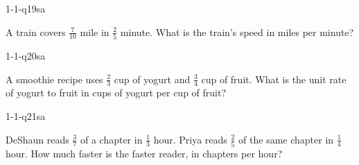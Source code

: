 \begin{practiceQuestion}{1-1-q19}{sa}
\begin{questionText}
A train covers $\frac{7}{10}$ mile in $\frac{2}{5}$ minute. What is the train's speed in miles per minute?
\end{questionText}
\end{practiceQuestion}

\begin{practiceQuestion}{1-1-q20}{sa}
\begin{questionText}
A smoothie recipe uses $\frac{2}{3}$ cup of yogurt and $\frac{3}{4}$ cup of fruit. What is the unit rate of yogurt to fruit in cups of yogurt per cup of fruit?
\end{questionText}
\end{practiceQuestion}

\begin{practiceQuestion}{1-1-q21}{sa}
\begin{questionText}
DeShaun reads $\frac{3}{7}$ of a chapter in $\frac{1}{3}$ hour. Priya reads $\frac{2}{5}$ of the same chapter in $\frac{1}{4}$ hour. How much faster is the faster reader, in chapters per hour?
\end{questionText}
\end{practiceQuestion}


